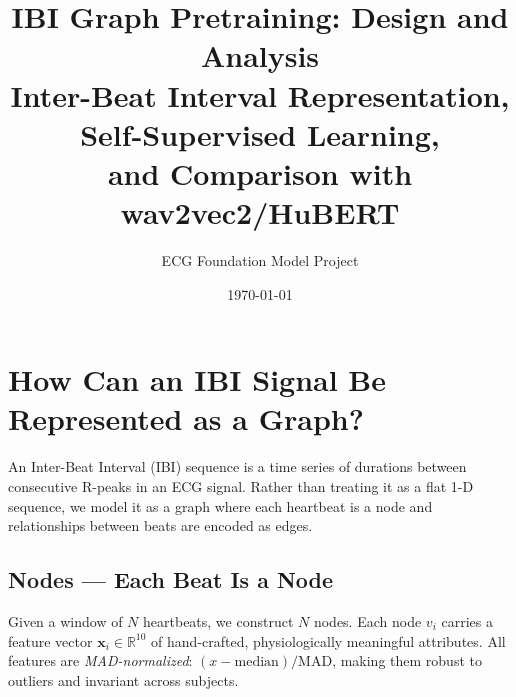 \documentclass[11pt,a4paper]{article}
\title{\textbf{IBI Graph Pretraining: Design and Analysis}\\
\large Inter-Beat Interval Representation, Self-Supervised Learning,\\and Comparison with wav2vec2/HuBERT}
\author{ECG Foundation Model Project}
\date{\today}
\begin{document}
\maketitle
\tableofcontents
\newpage

\section{How Can an IBI Signal Be Represented as a Graph?}

An Inter-Beat Interval (IBI) sequence is a time series of durations between consecutive R-peaks in an ECG signal.
Rather than treating it as a flat 1-D sequence, we model it as a graph where each heartbeat is a node and
relationships between beats are encoded as edges.

\subsection{Nodes --- Each Beat Is a Node}

Given a window of $N$ heartbeats, we construct $N$ nodes. Each node $v_i$ carries a feature vector
$\mathbf{x}_i \in \mathbb{R}^{10}$ of hand-crafted, physiologically meaningful attributes.
All features are \emph{MAD-normalized}: $(x - \text{median}) / \text{MAD}$, making them robust to
outliers and invariant across subjects.
\end{document}

